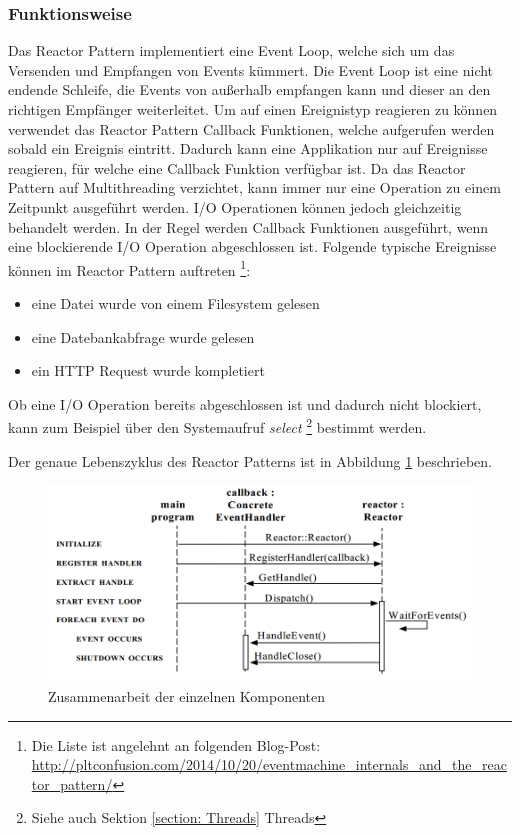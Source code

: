 \subsubsection{Funktionsweise}

Das Reactor Pattern implementiert eine Event Loop, welche sich um das Versenden und Empfangen von Events kümmert. Die Event Loop ist eine nicht endende Schleife, die Events von außerhalb empfangen kann und dieser an den richtigen Empfänger weiterleitet. Um auf einen Ereignistyp reagieren zu können verwendet das Reactor Pattern Callback Funktionen, welche aufgerufen werden sobald ein Ereignis eintritt. Dadurch kann eine Applikation nur auf Ereignisse reagieren, für welche eine Callback Funktion verfügbar ist. Da das Reactor Pattern auf Multithreading verzichtet, kann immer nur eine Operation zu einem Zeitpunkt ausgeführt werden. I/O Operationen können jedoch gleichzeitig behandelt werden. In der Regel werden Callback Funktionen ausgeführt, wenn eine blockierende I/O Operation abgeschlossen ist. Folgende typische Ereignisse können im Reactor Pattern auftreten \footnote{Die Liste ist angelehnt an folgenden Blog-Post: \url{http://pltconfusion.com/2014/10/20/eventmachine_internals_and_the_reactor_pattern/}}:

\begin{itemize}
  \item eine Datei wurde von einem Filesystem gelesen
  \item eine Datebankabfrage wurde gelesen
  \item ein HTTP Request wurde kompletiert
\end{itemize}

Ob eine I/O Operation bereits abgeschlossen ist und dadurch nicht blockiert, kann zum Beispiel über den Systemaufruf \emph{select} \footnote{Siehe auch Sektion \ref{section: Threads} Threads} bestimmt werden.

Der genaue Lebenszyklus des Reactor Patterns ist in Abbildung \ref{figure:reactor_cycle} beschrieben.

\begin{figure}[!htb]
  \centering
  \includegraphics[width=13cm]{images/reactor.png}
  \caption{
    Zusammenarbeit der einzelnen Komponenten \cite[p. 5]{Sch95}
  }
  \label{figure:reactor_cycle}
\end{figure}

